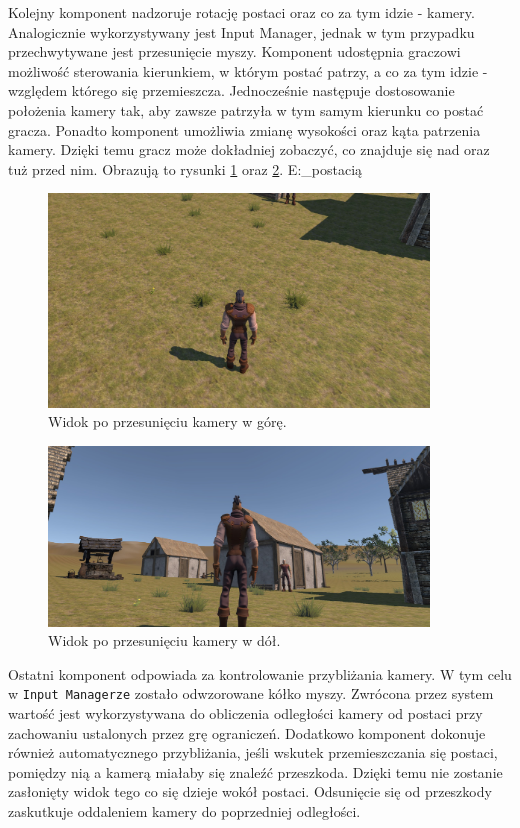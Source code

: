 Kolejny komponent nadzoruje rotację postaci oraz co za tym idzie - kamery. Analogicznie wykorzystywany jest Input
Manager, jednak w tym przypadku przechwytywane jest przesunięcie myszy. Komponent udostępnia graczowi możliwość
sterowania kierunkiem, w którym postać patrzy, a co za tym idzie - względem którego się przemieszcza. Jednocześnie
następuje dostosowanie położenia kamery tak, aby zawsze patrzyła w tym samym kierunku co postać gracza. Ponadto
komponent umożliwia zmianę wysokości oraz kąta patrzenia kamery. Dzięki temu gracz może dokładniej zobaczyć,
co znajduje się nad oraz tuż przed nim. Obrazują to rysunki \ref{fig:gora} oraz \ref{fig:dol}.
E:\MOJE\dyplom\RTS\docs\images\implementacja\poruszanie_postacią
\begin{figure}[h!]
    \centering
    \includegraphics[width=0.9\textwidth]{images/implementacja/poruszanie_postacią/widok_z_gory.jpg}
    \caption{Widok po przesunięciu kamery w górę.}\label{fig:gora}
\end{figure}

\begin{figure}[h!]
    \centering
    \includegraphics[width=0.9\textwidth]{images/implementacja/poruszanie_postacią/widok_z_dolu.jpg}
    \caption{Widok po przesunięciu kamery w dół.}\label{fig:dol}
\end{figure}

Ostatni komponent odpowiada za kontrolowanie przybliżania kamery. W tym celu w \texttt{Input Managerze} zostało odwzorowane kółko
myszy. Zwrócona przez system wartość jest wykorzystywana do obliczenia odległości kamery od postaci przy zachowaniu
ustalonych przez grę ograniczeń. Dodatkowo komponent dokonuje również automatycznego przybliżania, jeśli wskutek
przemieszczania się postaci, pomiędzy nią a kamerą miałaby się znaleźć przeszkoda. Dzięki temu nie zostanie zasłonięty
widok tego co się dzieje wokół postaci. Odsunięcie się od przeszkody zaskutkuje oddaleniem kamery do poprzedniej
odległości.
